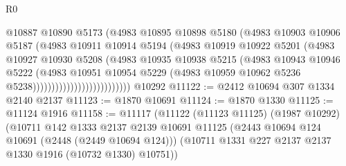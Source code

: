 \begin{lexlean}{R0}
\begin{coremodule}
                                      @10887
                                      @10890
                                      @5173
                                      (@4983
                                        @10895
                                        @10898
                                        @5180
                                        (@4983
                                          @10903
                                          @10906
                                          @5187
                                          (@4983
                                            @10911
                                            @10914
                                            @5194
                                            (@4983
                                              @10919
                                              @10922
                                              @5201
                                              (@4983
                                                @10927
                                                @10930
                                                @5208
                                                (@4983
                                                  @10935
                                                  @10938
                                                  @5215
                                                  (@4983
                                                    @10943
                                                    @10946
                                                    @5222
                                                    (@4983
                                                      @10951
                                                      @10954
                                                      @5229
                                                      (@4983
                                                        @10959
                                                        @10962
                                                        @5236
                                                        @5238))))))))))))))))))))))))))
    @10292
@11122 := @2412 @10694 @307 @1334 @2140 @2137
@11123 := @1870 @10691
@11124 := @1870 @1330
@11125 := @11124 @1916
@11158 := @11117
    (@11122
      (@11123 @11125)
      (@1987 @10292)
      (@10711
        @142
        @1333
        @2137
        @2139
        @10691
        @11125
        (@2443 @10694 @124 @10691 (@2448 (@2449 @10694 @124)))
        (@10711 @1331 @227 @2137 @2137 @1330 @1916 (@10732 @1330) @10751))

\end{coremodule}
\end{lexlean}
